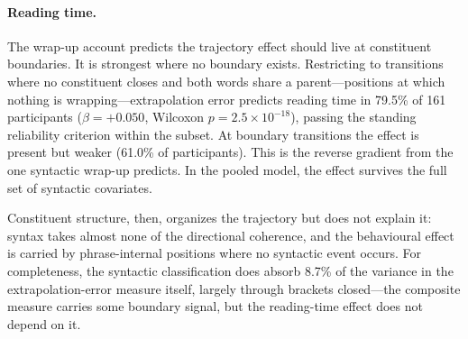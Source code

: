 \documentclass[12pt]{article}
\begin{document}
{\paragraph{Reading time.} The wrap-up account predicts the trajectory effect should live at constituent boundaries. It is strongest where no boundary exists. Restricting to transitions where no constituent closes and both words share a parent---positions at which nothing is wrapping---extrapolation error predicts reading time in 79.5\% of 161 participants ($\beta = +0.050$, Wilcoxon $p = 2.5 \times 10^{-18}$), passing the standing reliability criterion within the subset. At boundary transitions the effect is present but weaker (61.0\% of participants). This is the reverse gradient from the one syntactic wrap-up predicts. In the pooled model, the effect survives the full set of syntactic covariates.

Constituent structure, then, organizes the trajectory but does not explain it: syntax takes almost none of the directional coherence, and the behavioural effect is carried by phrase-internal positions where no syntactic event occurs. For completeness, the syntactic classification does absorb 8.7\% of the variance in the extrapolation-error measure itself, largely through brackets closed---the composite measure carries some boundary signal, but the reading-time effect does not depend on it.}
\end{document}
